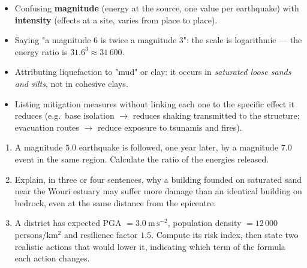 \documentclass[11pt]{article}
\begin{document}
\begin{attention}
\begin{itemize}
\item Confusing \textbf{magnitude} (energy at the source, one value per earthquake) with \textbf{intensity} (effects at a site, varies from place to place).
\item Saying "a magnitude 6 is twice a magnitude 3": the scale is logarithmic — the energy ratio is $31.6^3 \approx 31\,600$.
\item Attributing liquefaction to "mud" or clay: it occurs in \emph{saturated loose sands and silts}, not in cohesive clays.
\item Listing mitigation measures without linking each one to the specific effect it reduces (e.g.\ base isolation $\rightarrow$ reduces shaking transmitted to the structure; evacuation routes $\rightarrow$ reduce exposure to tsunamis and fires).
\end{itemize}
\end{attention}

\begin{exercice}
\begin{enumerate}
\item A magnitude $5.0$ earthquake is followed, one year later, by a magnitude $7.0$ event in the same region. Calculate the ratio of the energies released.
\item Explain, in three or four sentences, why a building founded on saturated sand near the Wouri estuary may suffer more damage than an identical building on bedrock, even at the same distance from the epicentre.
\item A district has expected PGA $= 3.0\ \mathrm{m\,s^{-2}}$, population density $= 12\,000$ persons/km$^2$ and resilience factor $1.5$. Compute its risk index, then state two realistic actions that would lower it, indicating which term of the formula each action changes.
\end{enumerate}
\end{exercice}
\end{document}
